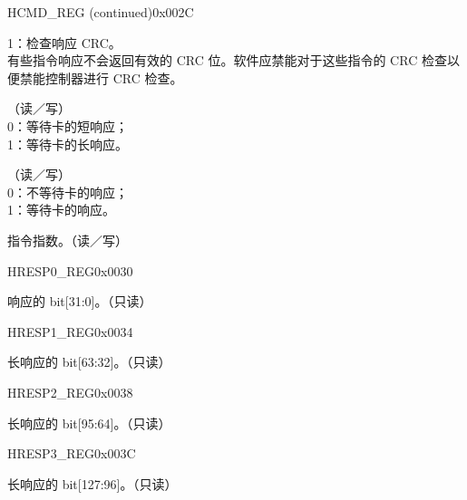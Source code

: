 \begin{register}{H}{CMD\_REG (continued)}{0x002C}
\begin{regdesc}
\begin{reglist}
1：检查响应 CRC。\\
有些指令响应不会返回有效的 CRC 位。软件应禁能对于这些指令的 CRC 检查以便禁能控制器进行 CRC 检查。
\item [RESPONSE\_LENGTH] （读／写）\\
0：等待卡的短响应；\\
1：等待卡的长响应。
\item [RESPONSE\_EXPECT] （读／写）\\
0：不等待卡的响应；\\
1：等待卡的响应。
\item [CMD\_INDEX]指令指数。（读／写）
\end{reglist}\end{regdesc}
\end{register}

\begin{register}{H}{RESP0\_REG}{0x0030}\label{regdesc:RESP0REG}
%
\regnewline%
\begin{regdesc}\begin{reglist}
\item [RESP0\_REG]响应的 bit[31:0]。（只读）
\end{reglist}\end{regdesc}
\end{register}


\begin{register}{H}{RESP1\_REG}{0x0034}\label{regdesc:RESP1REG}
%
\regnewline%
\begin{regdesc}\begin{reglist}
\item [RESP1\_REG]长响应的 bit[63:32]。（只读）
\end{reglist}\end{regdesc}
\end{register}


\begin{register}{H}{RESP2\_REG}{0x0038}\label{regdesc:RESP2REG}
%
\regnewline%
\begin{regdesc}\begin{reglist}
\item [RESP2\_REG]长响应的 bit[95:64]。（只读）
\end{reglist}\end{regdesc}
\end{register}


\begin{register}{H}{RESP3\_REG}{0x003C}\label{regdesc:RESP3REG}
%
\regnewline%
\begin{regdesc}\begin{reglist}
\item [RESP3\_REG]长响应的 bit[127:96]。（只读）
\end{reglist}\end{regdesc}
\end{register}


